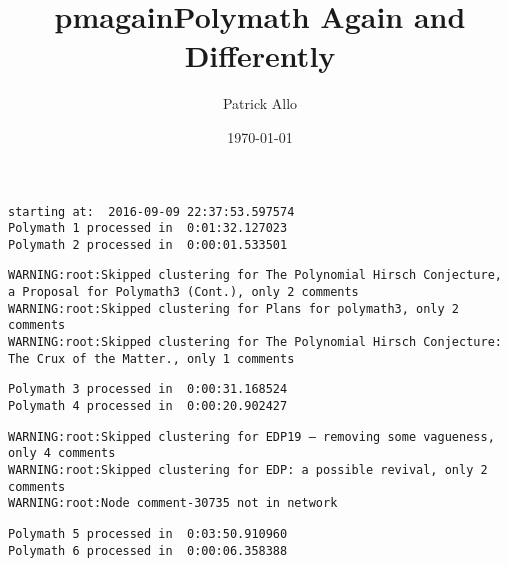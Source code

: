 \documentclass[article, floatfix, groupaddress, prb]{revtex4-1}
\title{pmagain}
\begin{document}
    
    
    \author{Patrick Allo}\title{Polymath Again and Differently}

\date{\today}
\maketitle

    
    

    







    \begin{Verbatim}[commandchars=\\\{\}]
starting at:  2016-09-09 22:37:53.597574
Polymath 1 processed in  0:01:32.127023
Polymath 2 processed in  0:00:01.533501

    \end{Verbatim}

    \begin{Verbatim}[commandchars=\\\{\}]
WARNING:root:Skipped clustering for The Polynomial Hirsch Conjecture, a Proposal for Polymath3 (Cont.), only 2 comments
WARNING:root:Skipped clustering for Plans for polymath3, only 2 comments
WARNING:root:Skipped clustering for The Polynomial Hirsch Conjecture: The Crux of the Matter., only 1 comments

    \end{Verbatim}

    \begin{Verbatim}[commandchars=\\\{\}]
Polymath 3 processed in  0:00:31.168524
Polymath 4 processed in  0:00:20.902427

    \end{Verbatim}

    \begin{Verbatim}[commandchars=\\\{\}]
WARNING:root:Skipped clustering for EDP19 — removing some vagueness, only 4 comments
WARNING:root:Skipped clustering for EDP: a possible revival, only 2 comments
WARNING:root:Node comment-30735 not in network

    \end{Verbatim}

    \begin{Verbatim}[commandchars=\\\{\}]
Polymath 5 processed in  0:03:50.910960
Polymath 6 processed in  0:00:06.358388

    \end{Verbatim}
\end{document}
